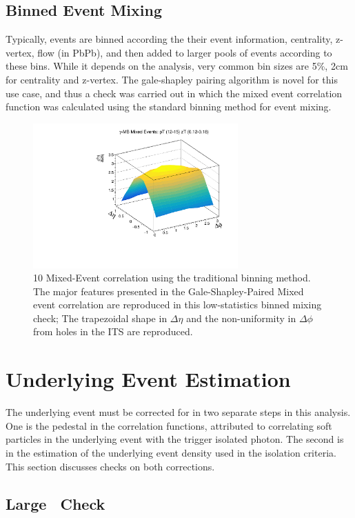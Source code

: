 \subsection{Binned Event Mixing}

Typically, events are binned according the their event information, centrality, z-vertex, flow (in PbPb), and then added to larger pools of events according to these bins. While it depends on the analysis, very common bin sizes are 5\%, 2cm for centrality and z-vertex. The gale-shapley pairing algorithm is novel for this use case, and thus a check was carried out in which the mixed event  correlation function was calculated using the standard binning method for event mixing.
\begin{figure}[htpb]
\center
\includegraphics[width=0.7\textwidth]{Data_Analysis/EventMixing/2D_Bin_Corr.pdf}%
\caption{10 Mixed-Event correlation using the traditional binning method. The major features presented in the Gale-Shapley-Paired Mixed event correlation are reproduced in this low-statistics binned mixing check; The trapezoidal shape in $\Delta\eta$ and the non-uniformity in $\Delta\phi$ from holes in the ITS are reproduced.}
\label{BIN_Mixed_2D}
\end{figure}
\FloatBarrier

\section{Underlying Event Estimation}
The underlying event must be corrected for in two separate steps in this analysis. One is the pedestal in the correlation functions, attributed to correlating soft particles in the underlying event with the trigger isolated photon. The second is in the estimation of the underlying event density used in the isolation criteria. This section discusses checks on both corrections.

\subsection{Large \deltaeta~Check}

